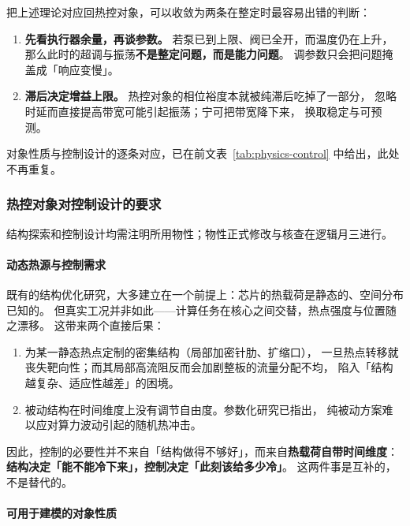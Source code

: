 \documentclass[stage2,fontset=fandol]{ydzjreport}
\begin{document}
	把上述理论对应回热控对象，可以收敛为两条在整定时最容易出错的判断：

	\begin{enumerate}
		\item \textbf{先看执行器余量，再谈参数。}
		若泵已到上限、阀已全开，而温度仍在上升，
		那么此时的超调与振荡\textbf{不是整定问题，而是能力问题}。
		调参数只会把问题掩盖成「响应变慢」。
		\item \textbf{滞后决定增益上限。}
		热控对象的相位裕度本就被纯滞后吃掉了一部分，
		忽略时延而直接提高带宽可能引起振荡；宁可把带宽降下来，
		换取稳定与可预测。
	\end{enumerate}

	对象性质与控制设计的逐条对应，已在前文表~\ref{tab:physics-control} 中给出，此处不再重复。

\subsubsection{热控对象对控制设计的要求}

	结构探索和控制设计均需注明所用物性；物性正式修改与核查在逻辑月三进行。


	\paragraph{动态热源与控制需求}

	既有的结构优化研究，大多建立在一个前提上：芯片的热载荷是静态的、空间分布已知的。
	但真实工况并非如此——计算任务在核心之间交替，热点强度与位置随之漂移\cite{wu,ji}。
	这带来两个直接后果：

	\begin{enumerate}
		\item 为某一静态热点定制的密集结构（局部加密针肋、扩缩口），
		一旦热点转移就丧失靶向性；而其局部高流阻反而会加剧整板的流量分配不均，
		陷入「结构越复杂、适应性越差」的困境。
		\item 被动结构在时间维度上没有调节自由度。参数化研究已指出，
		纯被动方案难以应对算力波动引起的随机热冲击\cite{laguna}。
	\end{enumerate}

	因此，控制的必要性并不来自「结构做得不够好」，而来自\textbf{热载荷自带时间维度}：
	\textbf{结构决定「能不能冷下来」，控制决定「此刻该给多少冷」}。
	这两件事是互补的，不是替代的。

	\paragraph{可用于建模的对象性质}
\end{document}
